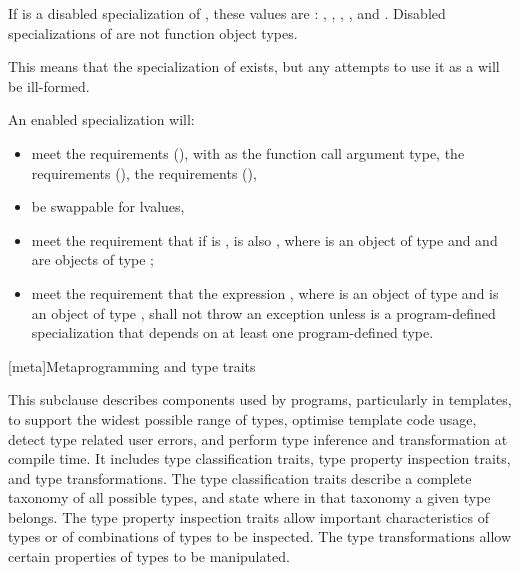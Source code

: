 \pnum
If  is a disabled specialization of ,
these values are :
,
,
,
, and
.
Disabled specializations of 
are not function object types.
\begin{note}
This means that the specialization of  exists, but
any attempts to use it as a  will be ill-formed.
\end{note}

\pnum
An enabled specialization  will:
\begin{itemize}
\item meet the  requirements (),
with  as the function
call argument type, the  requirements (),
the  requirements (),
\item be swappable for lvalues,
\item meet the requirement that if  is ,  is
also , where  is an object of type  and  and 
are objects of type ;
\item meet the requirement that the expression , where 
is an object of type  and  is an object of type
, shall not throw an exception unless  is a
program-defined specialization that depends on at least one program-defined type.
\end{itemize}

[meta]{Metaprogramming and type traits}

\pnum
This subclause describes components used by \Cpp{} programs, particularly in
templates, to support the widest possible range of types, optimise
template code usage, detect type related user errors, and perform
type inference and transformation at compile time. It includes type
classification traits, type property inspection traits, and type
transformations. The type classification traits describe a complete taxonomy
of all possible \Cpp{} types, and state where in that taxonomy a given
type belongs. The type property inspection traits allow important
characteristics of types or of combinations of types to be inspected. The
type transformations allow certain properties of types to be manipulated.


